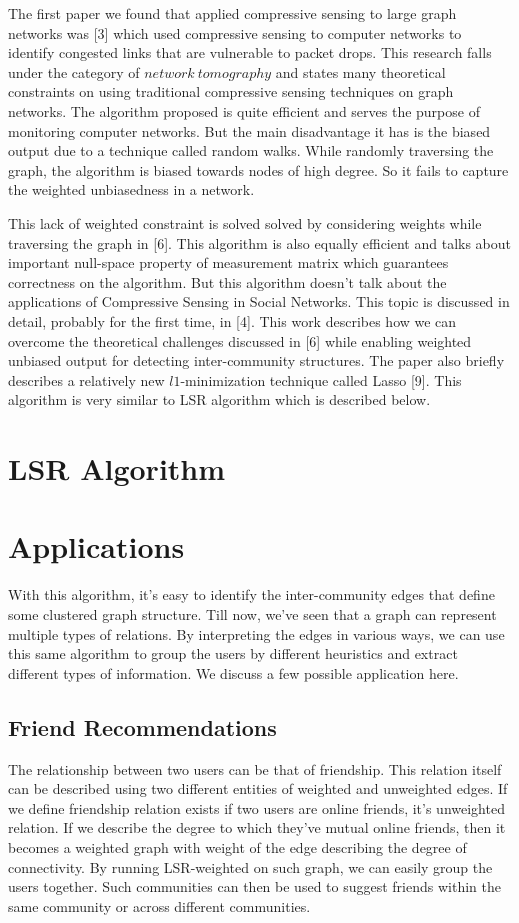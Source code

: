 \documentclass{article}
\begin{document}
The first paper we found that applied compressive sensing to large graph networks was [3] which used compressive sensing
to computer networks to identify congested links that are vulnerable to packet drops. This research falls under the
category of $network\ tomography$ and states many theoretical constraints on using traditional compressive sensing
techniques on graph networks. The algorithm proposed is quite efficient and serves the purpose of monitoring computer
networks. But the main disadvantage it has is the biased output due to a technique called random walks. While randomly
traversing the graph, the algorithm is biased towards nodes of high degree. So it fails to capture the weighted
unbiasedness in a network.

This lack of weighted constraint is solved solved by considering weights while traversing the graph in [6]. This
algorithm is also equally efficient and talks about important null-space property of measurement matrix which guarantees
correctness on the algorithm. But this algorithm doesn't talk about the applications of Compressive Sensing in Social
Networks. This topic is discussed in detail, probably for the first time, in [4]. This work describes how we can
overcome the theoretical challenges discussed in [6] while enabling weighted unbiased output for detecting
inter-community structures. The paper also briefly describes a relatively new $l1$-minimization technique called Lasso
[9]. This algorithm is very similar to LSR algorithm which is described below.  
\section{LSR Algorithm}

\section{Applications}
With this algorithm, it's easy to identify the inter-community edges that define some clustered graph structure. Till
now, we've seen that a graph can represent multiple types of relations. By interpreting the edges in various ways, we
can use this same algorithm to group the users by different heuristics and extract different types of information. We
discuss a few possible application here.
\subsection{Friend Recommendations}
The relationship between two users can be that of friendship. This relation itself can be described using two different
entities of weighted and unweighted edges. If we define friendship relation exists if two users are online friends, it's
unweighted relation. If we describe the degree to which they've mutual online friends, then it becomes a weighted graph
with weight of the edge describing the degree of connectivity. By running LSR-weighted on such graph, we can easily
group the users together. Such communities can then be used to suggest friends within the same community or across
different communities. 
\end{document}
